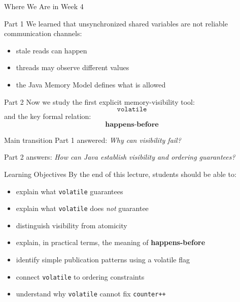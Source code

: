 \documentclass[aspectratio=169,11pt]{beamer}
\begin{document}
	\begin{frame}{Where We Are in Week 4}
		\begin{block}{Part 1}
			We learned that unsynchronized shared variables are not reliable communication channels:
			\begin{itemize}
				\item stale reads can happen
				\item threads may observe different values
				\item the Java Memory Model defines what is allowed
			\end{itemize}
		\end{block}
		
		\vspace{0.3cm}
		
		\begin{block}{Part 2}
			Now we study the first explicit memory-visibility tool:
			\[
			\texttt{volatile}
			\]
			and the key formal relation:
			\[
			\textbf{happens-before}
			\]
		\end{block}
		
		\vspace{0.3cm}
		
		\begin{exampleblock}{Main transition}
			Part 1 answered: \emph{Why can visibility fail?}
			
			Part 2 answers: \emph{How can Java establish visibility and ordering guarantees?}
		\end{exampleblock}
	\end{frame}
	
	\begin{frame}{Learning Objectives}
		By the end of this lecture, students should be able to:
		
		\begin{itemize}
			\item explain what \texttt{volatile} guarantees
			\item explain what \texttt{volatile} does \emph{not} guarantee
			\item distinguish visibility from atomicity
			\item explain, in practical terms, the meaning of \textbf{happens-before}
			\item identify simple publication patterns using a volatile flag
			\item connect \texttt{volatile} to ordering constraints
			\item understand why \texttt{volatile} cannot fix \texttt{counter++}
		\end{itemize}
	\end{frame}
	
\end{document}
